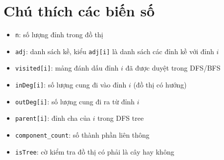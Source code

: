 \documentclass[12pt]{article}
\begin{document}
\section*{Chú thích các biến số}
\begin{itemize}
    \item \texttt{n}: số lượng đỉnh trong đồ thị
    \item \texttt{adj}: danh sách kề, kiểu \texttt{adj[i]} là danh sách các đỉnh kề với đỉnh $i$
    \item \texttt{visited[i]}: mảng đánh dấu đỉnh $i$ đã được duyệt trong DFS/BFS
    \item \texttt{inDeg[i]}: số lượng cung đi vào đỉnh $i$ (đồ thị có hướng)
    \item \texttt{outDeg[i]}: số lượng cung đi ra từ đỉnh $i$
    \item \texttt{parent[i]}: đỉnh cha của $i$ trong DFS tree
    \item \texttt{component\_count}: số thành phần liên thông
    \item \texttt{isTree}: cờ kiểm tra đồ thị có phải là cây hay không
\end{itemize}
\end{document}

